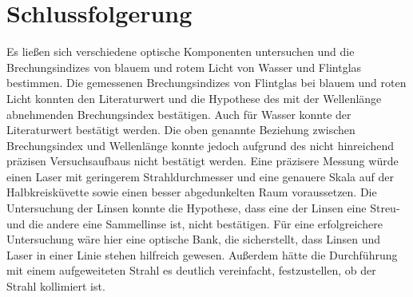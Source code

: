 \documentclass[
	a4paper,
	12pt,
	pagesize,
	ngerman
]{scrartcl}
\begin{document}
	\section{Schlussfolgerung}
	Es ließen sich verschiedene optische Komponenten untersuchen und die Brechungsindizes von blauem und rotem Licht von Wasser und Flintglas bestimmen.
	Die gemessenen Brechungsindizes von Flintglas bei blauem und roten Licht konnten den Literaturwert und die Hypothese des mit der Wellenlänge abnehmenden Brechungsindex bestätigen.
	Auch für Wasser konnte der Literaturwert bestätigt werden.
	Die oben genannte Beziehung zwischen Brechungsindex und Wellenlänge konnte jedoch aufgrund des nicht hinreichend präzisen Versuchsaufbaus nicht bestätigt werden.
	Eine präzisere Messung würde einen Laser mit geringerem Strahldurchmesser und eine genauere Skala auf der Halbkreisküvette sowie einen besser abgedunkelten Raum voraussetzen. %
	Die Untersuchung der Linsen konnte die Hypothese, dass eine der Linsen eine Streu- und die andere eine Sammellinse ist, nicht bestätigen.
	Für eine erfolgreichere Untersuchung wäre hier eine optische Bank, die sicherstellt, dass Linsen und Laser in einer Linie stehen hilfreich gewesen.
	Außerdem hätte die Durchführung mit einem aufgeweiteten Strahl es deutlich vereinfacht, festzustellen, ob der Strahl kollimiert ist.
	\printbibliography
\end{document}
